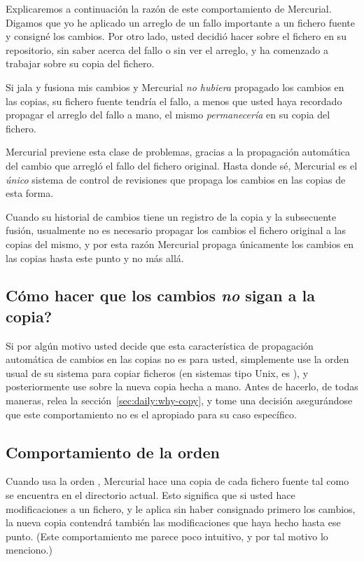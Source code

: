 Explicaremos a continuación la razón de este comportamiento de
Mercurial. Digamos que yo he aplicado un arreglo de un fallo importante a un
fichero fuente y consigné los cambios.  Por otro lado, usted decidió hacer
 sobre el fichero en su repositorio, sin saber acerca del
fallo o sin ver el arreglo, y ha comenzado a trabajar sobre su copia
del fichero.

Si jala y fusiona mis cambios y Mercurial \emph{no hubiera} propagado
los cambios en las copias, su fichero fuente tendría el fallo, a menos
que usted haya recordado propagar el arreglo del fallo a mano, el
mismo \emph{permanecería} en su copia del fichero.

Mercurial previene esta clase de problemas, gracias a la propagación
automática del cambio que arregló el fallo del fichero original. Hasta
donde sé, Mercurial es el \emph{único} sistema de control de
revisiones que propaga los cambios en las copias de esta forma.

Cuando su historial de cambios tiene un registro de la copia y la
subsecuente fusión, usualmente no es necesario propagar los cambios el
fichero original a las copias del mismo, y por esta razón Mercurial
propaga únicamente los cambios en las copias hasta este punto y no más
allá.


\subsection{Cómo hacer que los cambios \emph{no} sigan a la copia?}

Si por algún motivo usted decide que esta característica de
propagación automática de cambios en las copias no es para usted,
simplemente use
la orden usual de su sistema para copiar ficheros (en sistemas tipo
Unix, es ), y posteriormente use  sobre la nueva
copia hecha a mano.  Antes de hacerlo, de todas maneras, relea la
sección~\ref{sec:daily:why-copy}, y tome una decisión asegurándose que
este comportamiento no es el apropiado para su caso específico.

\subsection{Comportamiento de la orden }

Cuando usa la orden , Mercurial hace una copia de cada
fichero fuente tal como se encuentra en el directorio actual. Esto
significa que si usted hace
modificaciones a un fichero, y le aplica  sin haber
consignado primero los cambios, la nueva copia contendrá también las
modificaciones que haya hecho hasta ese punto. (Este comportamiento me
parece poco intuitivo, y por tal motivo lo menciono.)

